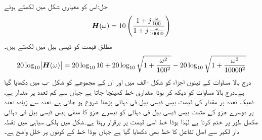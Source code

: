 حل:اس کو معیاری شکل  میں لکھتے ہوئے
\begin{align*}
{\ensuremath{{\boldsymbol{H}}}}(\omega)=10 \left(\frac{1+j\frac{\omega}{100}}{1+j\frac{\omega}{10000}}\right)
\end{align*}
مطلق قیمت کو ڈیسی بیل میں لکھتے ہیں۔
\begin{align*}
20\log_{10}\abs{{{\boldsymbol{H}}}(\omega)}=20\log_{10} 10+20\log_{10}\sqrt{1+\frac{\omega^2}{100^2}}-20\log_{10}\sqrt{1+\frac{\omega^2}{10000^2}}
\end{align*}
درج بالا مساوات کے تینوں اجزاء کو شکل -الف میں اور ان کے مجموعے کو شکل -ب میں دکھایا گیا ہے۔درج بالا مساوات کو دیکھ کر بوڈا مقداری خط کھینچا جاتا ہے جہاں  سے کم تعدد پر مقدار  ہے، ٹھیک  تعدد پر مقدار کی قیمت بیس ڈیسی بیل فی دہائی بڑھنا شروع ہو جاتی ہے۔تعدد  سے زیادہ تعدد پر دوسرے جزو کے مثبت بیس ڈیسی بیل فی دہائی کو تیسرے جزو کا منفی بیس ڈیسی بیل فی دہائی مکمل طور پر ختم کرتا ہے لہٰذا بوڈا خط اسی قیمت پر برقرار رہتا ہے۔شکل میں ہلکی سیاہی میں نقطہ دار لکیر سے اصل تفاعل کا خط بھی دکھایا گیا ہے جہاں بوڈا خط کے کونوں پر  خلل واضح ہے۔
